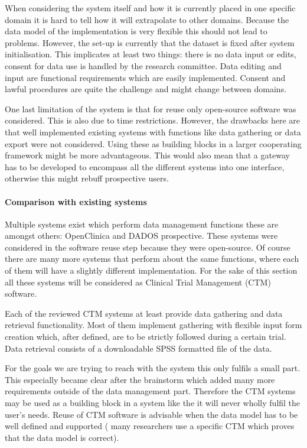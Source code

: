 When considering the system itself and how it is currently placed in one specific domain it is hard to tell how it will extrapolate to other domains.
Because the data model of the implementation is very flexible this should not lead to problems.
However, the set-up is currently that the dataset is fixed after system initialisation.
This implicates at least two things: there is no data input or edits, consent for data use is handled by the research committee.
Data editing and input are functional requirements which are easily implemented.
Consent and lawful procedures are quite the challenge and might change between domains.

One last limitation of the system is that for reuse only open-source software was considered.
This is also due to time restrictions.
However, the drawbacks here are that well implemented existing systems with functions like data gathering or data export were not considered.
Using these as building blocks in a larger cooperating framework might be more advantageous.
This would also mean that a gateway has to be developed to encompass all the different systems into one interface, otherwise this might rebuff prospective users.

\paragraph{Comparison with existing systems}
Multiple systems exist which perform data management functions these are amongst others: OpenClinica and DADOS prospective.
These systems were considered in the software reuse step because they were open-source.
Of course there are many more systems that perform about the same functions, where each of them will have a slightly different implementation.
For the sake of this section all these systems will be considered as Clinical Trial Management (CTM) software.

Each of the reviewed CTM systems at least provide data gathering and data retrieval functionality.
Most of them implement gathering with flexible input form creation which, after defined, are to be strictly followed during a certain trial.
Data retrieval consists of a downloadable SPSS formatted file of the data.

For the goals we are trying to reach with the system this only fulfils a small part.
This especially became clear after the brainstorm which added many more requirements outside of the data management part.
Therefore the CTM systems may be used as a building block in a system like the \ivfsystem{} it will never wholly fulfil the user's needs.
Reuse of CTM software is advisable when the data model has to be well defined and supported (\ie{} many researchers use a specific CTM which proves that the data model is correct).

